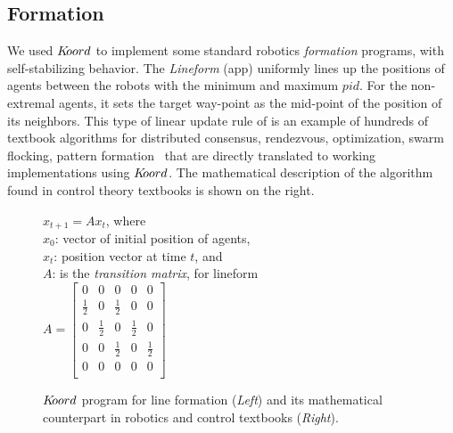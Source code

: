 \subsection{Formation}
\label{sec:formation}
We used $K\kern-2pt oord$ to implement some standard robotics \emph{formation} programs, with self-stabilizing behavior. The \emph{Lineform} (app) uniformly lines up the positions of  agents between the robots with the minimum and maximum $pid$. For the non-extremal agents, it sets the target way-point as the mid-point of the position of its neighbors. This type of linear update rule of is an example of hundreds of textbook algorithms for distributed consensus, rendezvous, optimization, swarm flocking, pattern formation~\cite{Tsitsiklis:1986,Blondel,Magnusbook2010} that are directly translated to working implementations using $K\kern-2pt oord$. The mathematical description of the algorithm found in control theory textbooks is shown on the right. 

\begin{figure}[ht!]
	\label{fig:lineform}
	\noindent
	\begin{center}
		\scriptsize
		{}
		{ \vspace{0.1in}
                        $x_{t+1} = Ax_{t}$, where \\
			$x_0$: vector of initial position of agents, \\
			$x_{t}$: position vector at time $t$, and \\
		        $A$: is the \emph{transition matrix}, for lineform  \\
                  
			$A  = \left[ \begin{array}{ccccc}
			0 & 0 & 0 & 0 & 0\\
			\frac{1}{2} & 0 & \frac{1}{2} & 0 & 0\\
			0 & \frac{1}{2} & 0 & \frac{1}{2} & 0  \\
			0 & 0 & \frac{1}{2} & 0 & \frac{1}{2} \\
			0 & 0 & 0 & 0 & 0\\			
			\end{array}\right]$
			}
	\par
        
	\end{center}
	\caption{\small $K\kern-2pt oord$ program for line formation ({\em Left}) and its mathematical counterpart in robotics and control textbooks ({\em Right}).}
\end{figure}

